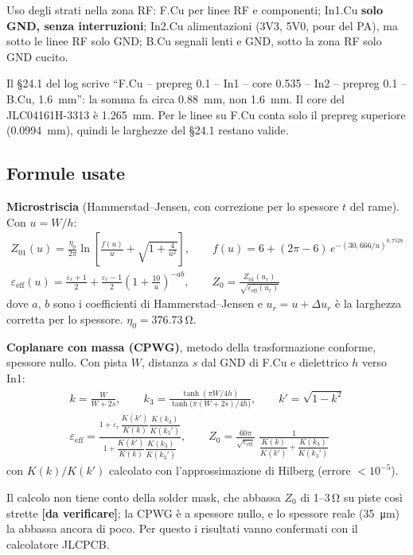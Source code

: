 \documentclass[a4paper,10pt]{article}
\newcommand{\dv}{\textcolor{verfr}{\textbf{[da verificare]}}}
\begin{document}
Uso degli strati nella zona RF: F.Cu per linee RF e componenti; In1.Cu \textbf{solo GND, senza
interruzioni}; In2.Cu alimentazioni (3V3, 5V0, pour del PA), ma sotto le linee RF solo GND; B.Cu segnali
lenti e GND, sotto la zona RF solo GND cucito.

\begin{attenzione}
Il \S24.1 del log scrive \enquote{F.Cu -- prepreg 0.1 -- In1 -- core 0.535 -- In2 -- prepreg 0.1 -- B.Cu,
\SI{1.6}{mm}}: la somma fa circa \SI{0.88}{mm}, non \SI{1.6}{mm}. Il core del JLC04161H-3313 è
\SI{1.265}{mm}. Per le linee su F.Cu conta solo il prepreg superiore (\SI{0.0994}{mm}), quindi le
larghezze del \S24.1 restano valide.
\end{attenzione}

\subsection{Formule usate}
\textbf{Microstriscia} (Hammerstad--Jensen, con correzione per lo spessore $t$ del rame). Con $u=W/h$:
\begin{gather*}
Z_{01}(u)=\frac{\eta_0}{2\pi}\ln\!\left[\frac{f(u)}{u}+\sqrt{1+\frac{4}{u^2}}\right],\qquad
f(u)=6+(2\pi-6)\,e^{-(30{,}666/u)^{0{,}7528}}\\[2pt]
\varepsilon_\mathrm{eff}(u)=\frac{\varepsilon_r+1}{2}+\frac{\varepsilon_r-1}{2}\left(1+\frac{10}{u}\right)^{-ab},
\qquad Z_0=\frac{Z_{01}(u_r)}{\sqrt{\varepsilon_\mathrm{eff}(u_r)}}
\end{gather*}
dove $a$, $b$ sono i coefficienti di Hammerstad--Jensen e $u_r=u+\Delta u_r$ è la larghezza corretta per
lo spessore. $\eta_0=\SI{376.73}{\ohm}$.

\textbf{Coplanare con massa (CPWG)}, metodo della trasformazione conforme, spessore nullo. Con pista $W$,
distanza $s$ dal GND di F.Cu e dielettrico $h$ verso In1:
\begin{gather*}
k=\frac{W}{W+2s},\qquad k_3=\frac{\tanh(\pi W/4h)}{\tanh\!\big(\pi (W+2s)/4h\big)},\qquad k'=\sqrt{1-k^2}\\[2pt]
\varepsilon_\mathrm{eff}=\frac{1+\varepsilon_r\,\dfrac{K(k')}{K(k)}\dfrac{K(k_3)}{K(k_3')}}{1+\dfrac{K(k')}{K(k)}\dfrac{K(k_3)}{K(k_3')}},\qquad
Z_0=\frac{60\pi}{\sqrt{\varepsilon_\mathrm{eff}}}\;\frac{1}{\dfrac{K(k)}{K(k')}+\dfrac{K(k_3)}{K(k_3')}}
\end{gather*}
con $K(k)/K(k')$ calcolato con l'approssimazione di Hilberg (errore $<10^{-5}$).

Il calcolo non tiene conto della solder mask, che abbassa $Z_0$ di 1--3\,\si{\ohm} su piste così strette
\dv; la CPWG è a spessore nullo, e lo spessore reale (\SI{35}{\micro\metre}) la abbassa ancora di poco.
Per questo i risultati vanno confermati con il calcolatore JLCPCB.
\end{document}
